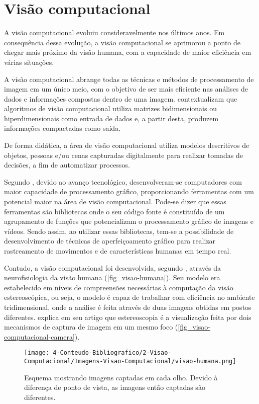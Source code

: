 \section{\textbf{{Visão computacional}}}
\label{visao-computacional}

A visão computacional evoluiu consideravelmente nos últimos anos. Em consequência dessa evolução, a visão computacional se aprimorou a ponto de chegar mais próximo da visão humana, com a capacidade de maior eficiência em várias situações.

A visão computacional abrange todas as técnicas e métodos de processamento de imagem em um único meio, com o objetivo de ser mais eficiente nas análises de dados e informações compostas dentro de uma imagem.  contextualizam que algoritmos de visão computacional utiliza matrizes bidimensionais ou hiperdimensionais como entrada de dados e, a partir desta, produzem informações compactadas como saída.

De forma didática, a área de visão computacional utiliza modelos descritivos de objetos, pessoas e/ou cenas capturadas digitalmente para realizar tomadas de decisões, a fim de automatizar processos.

Segundo , devido ao avanço tecnológico, desenvolveram-se computadores com maior capacidade de processamento gráfico, proporcionando ferramentas com um potencial maior na área de visão computacional. Pode-se dizer que essas ferramentas são bibliotecas onde o seu código fonte é constituído de um agrupamento de funções que potencializam o processamento gráfico de imagens e vídeos. Sendo assim, ao utilizar essas bibliotecas, tem-se a possibilidade de desenvolvimento de técnicas de aperfeiçoamento gráfico para realizar rastreamento de movimentos e de características humanas em tempo real.

Contudo, a visão computacional foi desenvolvida, segundo , através da neurofisiologia da visão humana (\autoref{fig_visao-humana}). Seu modelo era estabelecido em níveis de compreensões necessárias à computação da visão estereoscópica, ou seja, o modelo é capaz de trabalhar com eficiência no ambiente tridimensional, onde a análise é feita através de duas imagens obtidas em postos diferentes.  explica em seu artigo que estereoscopia é a visualização feita por dois mecanismos de captura de imagem em um mesmo foco (\autoref{fig_visao-computacional-camera}).

\begin{figure}[h]
	\caption{\label{fig_visao-humana}Esquema mostrando imagens captadas em cada olho. Devido à diferença de
ponto de vista, as imagens então captadas são diferentes.}
	\begin{center}
		\texttt{[image: 4-Conteudo-Bibliografico/2-Visao-Computacional/Imagens-Visao-Computacional/visao-humana.png]}
	\end{center}
	\centering {}
\end{figure}

